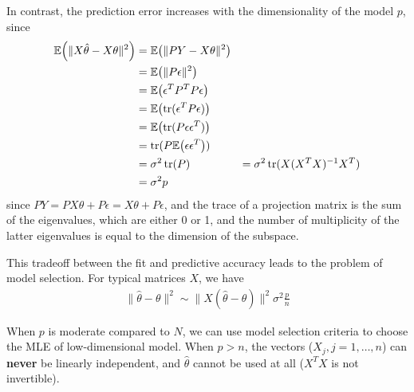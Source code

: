 In contrast, the prediction error increases with the dimensionality of
the model $p$, since
\begin{align}
  \label{eq:100}
  \E{\| X \hat \theta - X \theta \|^{2}} &= \E{\| PY - X \theta
    \|^{2}} \\
  &= \E{ \| P\epsilon \|^{2}} \\
  &= \E{\epsilon^{T} P^{T} P \epsilon} \\
  &= \E{\tr(\epsilon^{T}P\epsilon)} \\
  &= \E{\tr(P \epsilon \epsilon^{T})} \\
  &= \tr(P \E{\epsilon \epsilon^{T}}) \\
  &= \sigma^{2} \tr(P)
  &= \sigma^{2} \tr(X (X^{T} X)^{-1} X^{T}) \\
  &= \sigma^{2} p
\end{align} since $PY = PX\theta + P \epsilon = X \theta + P\epsilon$,
and the trace of a projection matrix is the sum of the eigenvalues,
which are either 0 or 1, and the number of multiplicity of the latter
eigenvalues is equal to the dimension of the subspace.

This tradeoff between the fit and predictive accuracy leads to the
problem of model selection.  For typical matrices $X$, we have
\begin{align}
  \label{eq:100}
  \| \hat \theta - \theta \|^{2} \sim \| X(\hat \theta - \theta)
  \|^{2} \sigma^{2} \frac{p}{n}
\end{align}

When $p$ is moderate compared to $N$, we can use model selection
criteria to choose the MLE of low-dimensional model.  When $p > n$,
the vectors ($X_{j}, j =1, \dots, n$) can \textbf{never} be linearly
independent, and $\hat \theta$ cannot be used at all ($X^{T} X$ is not
invertible).

